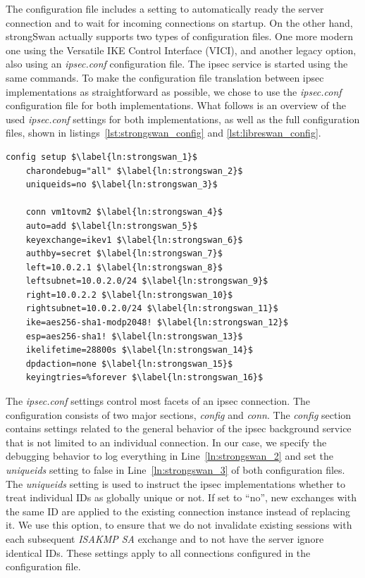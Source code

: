 The configuration file includes a setting to automatically ready the server connection and to wait for incoming connections on startup. On the other hand, strongSwan actually supports two types of configuration files. One more modern one using the Versatile IKE Control Interface (VICI), and another legacy option, also using an \emph{ipsec.conf} configuration file. The \ac{ipsec} service is started using the same commands. To make the configuration file translation between \ac{ipsec} implementations as straightforward as possible, we chose to use the \emph{ipsec.conf} configuration file for both implementations. What follows is an overview of the used \emph{ipsec.conf} settings for both implementations, as well as the full configuration files, shown in listings~\ref{lst:strongswan_config} and \ref{lst:libreswan_config}.

\begin{lstlisting}[mathescape=true, float=ht, caption=Configuration options of the strongSwan server., label=lst:strongswan_config]
	config setup $\label{ln:strongswan_1}$
	charondebug="all" $\label{ln:strongswan_2}$
	uniqueids=no $\label{ln:strongswan_3}$
	
	conn vm1tovm2 $\label{ln:strongswan_4}$
	auto=add $\label{ln:strongswan_5}$
	keyexchange=ikev1 $\label{ln:strongswan_6}$
	authby=secret $\label{ln:strongswan_7}$
	left=10.0.2.1 $\label{ln:strongswan_8}$
	leftsubnet=10.0.2.0/24 $\label{ln:strongswan_9}$
	right=10.0.2.2 $\label{ln:strongswan_10}$
	rightsubnet=10.0.2.0/24 $\label{ln:strongswan_11}$
	ike=aes256-sha1-modp2048! $\label{ln:strongswan_12}$
	esp=aes256-sha1! $\label{ln:strongswan_13}$
	ikelifetime=28800s $\label{ln:strongswan_14}$
	dpdaction=none $\label{ln:strongswan_15}$
	keyingtries=%forever $\label{ln:strongswan_16}$
\end{lstlisting}

The \emph{ipsec.conf} settings control most facets of an \ac{ipsec} connection. The configuration consists of two major sections, \emph{config} and \emph{conn}. The \emph{config} section contains settings related to the general behavior of the \ac{ipsec} background service that is not limited to an individual connection. In our case, we specify the debugging behavior to log everything in Line~\ref{ln:strongswan_2} and set the \emph{uniqueids} setting to false in Line~\ref{ln:strongswan_3} of both configuration files. The \emph{uniqueids} setting is used to instruct the \ac{ipsec} implementations whether to treat individual IDs as globally unique or not. If set to ``no'', new exchanges with the same ID are applied to the existing connection instance instead of replacing it. We use this option, to ensure that we do not invalidate existing sessions with each subsequent \emph{ISAKMP SA} exchange and to not have the server ignore identical IDs. These settings apply to all connections configured in the configuration file. \\

